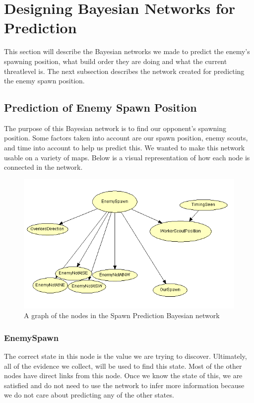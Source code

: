 \section{Designing Bayesian Networks for Prediction}\label{bayesian_network}
This section will describe the Bayesian networks we made to predict the enemy's spawning position, what build order they are doing and what the current 
threatlevel is. The next subsection describes the network created for predicting the enemy spawn position.

\subsection{Prediction of Enemy Spawn Position}			 
			
The purpose of this Bayesian network is to find our opponent's spawning position. Some factors taken into account are our spawn position, enemy scouts, and time into account to help us predict this. We wanted to make this network usable on a variety of maps. Below is a visual representation of how each node is connected in the network.

\begin{figure}[H]
	\includegraphics[scale=0.8]{Figures/BayesianPictures/SpawnPrediction.png}
	\caption{A graph of the nodes in the Spawn Prediction Bayesian network}
	\label{fig:predicting}
\end{figure}

\subsubsection*{EnemySpawn}
The correct state in this node is the value we are trying to discover. Ultimately, all of the evidence we collect, will be used to find this state. Most of the other nodes have direct links from this node. Once we know the state of this, we are satisfied and do not need to use the network to infer more information because we do not care about predicting any of the other states.

